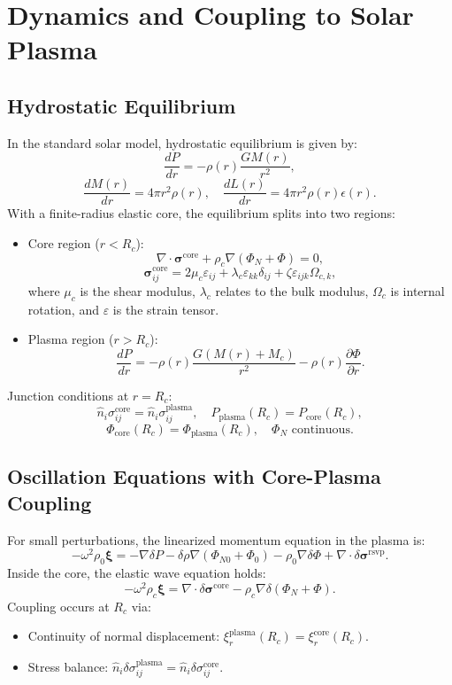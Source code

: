 \documentclass{article}
\begin{document}
\section{Dynamics and Coupling to Solar Plasma}

\subsection{Hydrostatic Equilibrium}

In the standard solar model, hydrostatic equilibrium is given by:
\[
\frac{dP}{dr} = -\rho(r) \frac{G M(r)}{r^2},
\]
\[
\frac{dM(r)}{dr} = 4\pi r^2 \rho(r), \quad \frac{dL(r)}{dr} = 4\pi r^2 \rho(r) \epsilon(r).
\]
With a finite-radius elastic core, the equilibrium splits into two regions:
\begin{itemize}
\item Core region ($r < R_c$):
\[
\nabla \cdot \boldsymbol{\sigma}^{\text{core}} + \rho_c \nabla (\Phi_N + \Phi) = 0,
\]
\[
\boldsymbol{\sigma}^{\text{core}}_{ij} = 2 \mu_c \varepsilon_{ij} + \lambda_c \varepsilon_{kk} \delta_{ij} + \zeta \varepsilon_{ijk} \Omega_{c,k},
\]
where $\mu_c$ is the shear modulus, $\lambda_c$ relates to the bulk modulus, $\Omega_c$ is internal rotation, and $\varepsilon$ is the strain tensor.
\item Plasma region ($r > R_c$):
\[
\frac{dP}{dr} = -\rho(r) \frac{G (M(r) + M_c)}{r^2} - \rho(r) \frac{\partial \Phi}{\partial r}.
\]
\end{itemize}
Junction conditions at $r = R_c$:
\[
\hat{n}_i \sigma^{\text{core}}_{ij} = \hat{n}_i \sigma^{\text{plasma}}_{ij}, \quad P_{\text{plasma}}(R_c) = P_{\text{core}}(R_c),
\]
\[
\Phi_{\text{core}}(R_c) = \Phi_{\text{plasma}}(R_c), \quad \Phi_N \text{ continuous}.
\]

\subsection{Oscillation Equations with Core-Plasma Coupling}

For small perturbations, the linearized momentum equation in the plasma is:
\[
-\omega^2 \rho_0 \boldsymbol{\xi} = -\nabla \delta P - \delta \rho \nabla (\Phi_{N0} + \Phi_0) - \rho_0 \nabla \delta \Phi + \nabla \cdot \delta \boldsymbol{\sigma}^{\text{rsvp}}.
\]
Inside the core, the elastic wave equation holds:
\[
-\omega^2 \rho_c \boldsymbol{\xi} = \nabla \cdot \delta \boldsymbol{\sigma}^{\text{core}} - \rho_c \nabla \delta (\Phi_N + \Phi).
\]
Coupling occurs at $R_c$ via:
\begin{itemize}
\item Continuity of normal displacement: $\xi_r^{\text{plasma}}(R_c) = \xi_r^{\text{core}}(R_c)$.
\item Stress balance: $\hat{n}_i \delta \sigma^{\text{plasma}}_{ij} = \hat{n}_i \delta \sigma^{\text{core}}_{ij}$.
\end{itemize}
\end{document}

